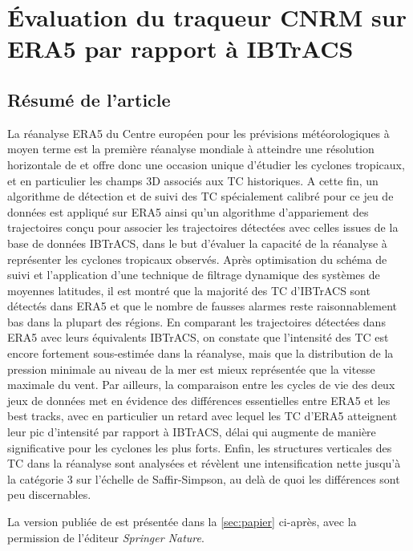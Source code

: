 \documentclass[../main.tex]{subfiles}
\begin{document}
\section{Évaluation du traqueur CNRM sur ERA5 par rapport à IBTrACS}\label{sec:eval_tracker_ERA5}

\subsection{Résumé de l'article}

La réanalyse ERA5 du Centre européen pour les prévisions météorologiques à moyen terme est la première réanalyse mondiale à atteindre une résolution horizontale
de  et offre donc une occasion unique d'étudier les cyclones tropicaux, et en particulier les champs 3D associés aux TC historiques. A cette fin, un
algorithme de détection et de suivi des TC spécialement calibré pour ce jeu de données est appliqué sur ERA5 ainsi qu'un algorithme d'appariement des
trajectoires conçu pour associer les trajectoires détectées avec celles issues de la base de données IBTrACS, dans le but d'évaluer la capacité de la réanalyse
à représenter les cyclones tropicaux observés. Après optimisation du schéma de suivi et l'application d'une technique de filtrage dynamique des systèmes de
moyennes latitudes, il est montré que la majorité des TC d'IBTrACS sont détectés dans ERA5 et que le nombre de fausses alarmes reste raisonnablement bas dans la
plupart des régions. En comparant les trajectoires détectées dans ERA5 avec leurs équivalents IBTrACS, on constate que l'intensité des TC est encore fortement
sous-estimée dans la réanalyse, mais que la distribution de la pression minimale au niveau de la mer est mieux représentée que la vitesse maximale du vent. Par
ailleurs, la comparaison entre les cycles de vie des deux jeux de données met en évidence des différences essentielles entre ERA5 et les best tracks, avec en
particulier un retard avec lequel les TC d'ERA5 atteignent leur pic d'intensité par rapport à IBTrACS, délai qui augmente de manière significative pour les
cyclones les plus forts. Enfin, les structures verticales des TC dans la réanalyse sont analysées et révèlent une intensification nette jusqu'à la catégorie 3
sur l'échelle de Saffir-Simpson, au delà de quoi les différences sont peu discernables.

La version publiée de \textcite{dulac_assessing_2023} est présentée dans la \cref{sec:papier} ci-après, avec la permission de l'éditeur \textit{Springer Nature}.
\end{document}
